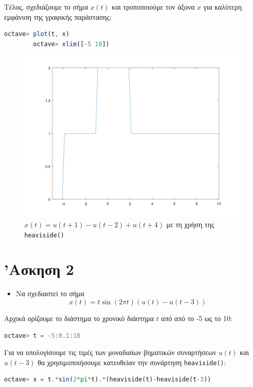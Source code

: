 \documentclass{article}
\begin{document}
Τέλος, σχεδιάζουμε το σήμα $x(t)$ και τροποποιούμε τον άξονα $x$
για καλύτερη εμφάνιση της γραφικής παράστασης:
\begin{lstlisting}[language=octave]
        octave> plot(t, x)
        octave> xlim([-5 10])
\end{lstlisting}

\begin{figure}[H]
        \centering
        \includegraphics[width=\linewidth]{res/fig2.png}
        \caption{$x(t) = u(t + 1) - u(t - 2) + u(t + 4)$ με τη χρήση της
                \lstinline{heaviside()}}
\end{figure}

\section{'Ασκηση 2}

\begin{itemize}
        \item Να σχεδιαστεί το σήμα
                \[x(t) = t\sin(2\pi t)(u(t) - u(t - 3))\]
\end{itemize}

Αρχικά ορίζουμε το διάστημα το χρονικό διάστημα $t$ από από το -5 ως το 10:
\begin{lstlisting}[language=octave]
        octave> t = -5:0.1:10
\end{lstlisting}

Για να υπολογίσουμε τις τιμές των μοναδιαίων βηματικών συναρτήσεων $u(t)$
και $u(t - 3)$ θα χρησιμοποιήσουμε κατευθείαν την συνάρτηση 
\lstinline{heaviside()}:
\begin{lstlisting}[language=octave]
        octave> x = t.*sin(2*pi*t).*(heaviside(t)-heaviside(t-3))
\end{lstlisting}
\end{document}
